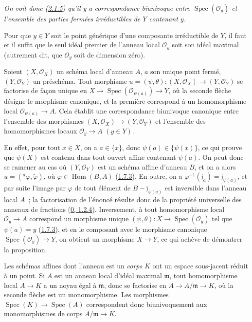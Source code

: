 \emph{On voit donc (\hyperref[I.2.1.5-fr]{2.1.5}) qu'il y a correspondance
biunivoque entre $\operatorname{Spec}(\mathscr{O}_y)$ et l'ensemble des
parties fermées irréductibles de $Y$ contenant $y$.}

\begin{corollary}[2.4.3]
\label{I.2.4.3-fr}
Pour que $y\in Y$ soit le point générique d'une composante irréductible de
$Y$, il faut et il suffit que le seul idéal premier de l'anneau local
$\mathscr{O}_y$ soit son idéal maximal (autrement dit, que $\mathscr{O}_y$
soit de dimension zéro).
\end{corollary}

\begin{proposition}[2.4.4]
\label{I.2.4.4-fr}
Soient $(X,\mathscr{O}_X)$ un schéma local d'anneau $A$, $a$ son unique point
fermé, $(Y,\mathscr{O}_Y)$ un préschéma. Tout morphisme
$u=(\psi,\theta):(X,\mathscr{O}_X)\to(Y,\mathscr{O}_Y)$ se factorise de façon
unique en
$X\to\operatorname{Spec}(\mathscr{O}_{\psi(a)})\to Y$, où la seconde flèche
désigne le morphisme canonique, et la première correspond à un homomorphisme
local $\mathscr{O}_{\psi(a)}\to A$. Cela établit une correspondance biunivoque
canonique entre l'ensemble des morphismes
$(X,\mathscr{O}_X)\to(Y,\mathscr{O}_Y)$ et l'ensemble des homomorphismes locaux
$\mathscr{O}_y\to A$ $(y\in Y)$.
\end{proposition}

En effet, pour tout $x\in X$, on a $a\in\overline{\{x\}}$, donc
$\psi(a)\in\overline{\{\psi(x)\}}$, ce qui prouve que $\psi(X)$ est contenu
dans tout ouvert affine contenant $\psi(a)$. On peut donc se ramener au cas où
$(Y,\mathscr{O}_Y)$ est un schéma affine d'anneau $B$, et on a alors
$u=({}^a\varphi,\widetilde{\varphi})$, où
$\varphi\in\operatorname{Hom}(B,A)$ (\hyperref[I.1.7.3-fr]{1.7.3}). En outre,
on a $\varphi^{-1}(\mathfrak{j}_a)=\mathfrak{j}_{\psi(a)}$, et par suite
l'image par $\varphi$ de tout élément de $B-\mathfrak{j}_{\psi(a)}$ est
inversible dans l'anneau local $A$~; la factorisation de l'énoncé résulte donc
de la propriété universelle des anneaux de fractions
(\hyperref[0.1.2.4-fr]{0, 1.2.4}). Inversement, à tout homomorphisme local
$\mathscr{O}_y\to A$ correspond un morphisme unique
$(\psi,\theta):X\to\operatorname{Spec}(\mathscr{O}_y)$ tel que $\psi(a)=y$
(\hyperref[I.1.7.3-fr]{1.7.3}), et en le composant avec le morphisme canonique
$\operatorname{Spec}(\mathscr{O}_y)\to Y$, on obtient un morphisme $X\to Y$,
ce qui achève de démontrer la proposition.

\begin{env}[2.4.5]
\label{I.2.4.5-fr}
Les schémas affines dont l'anneau est un \emph{corps} $K$ ont un espace
sous-jacent réduit à un point. Si $A$ est un anneau local d'idéal maximal
$\mathfrak{m}$, tout homomorphisme local $A\to K$ a un noyau égal à
$\mathfrak{m}$, donc se factorise en
$A\to A/\mathfrak{m}\to K$, où la seconde flèche est un monomorphisme. Les
morphismes $\operatorname{Spec}(K)\to\operatorname{Spec}(A)$ correspondent
donc biunivoquement aux monomorphismes de corps $A/\mathfrak{m}\to K$.
\end{env}

